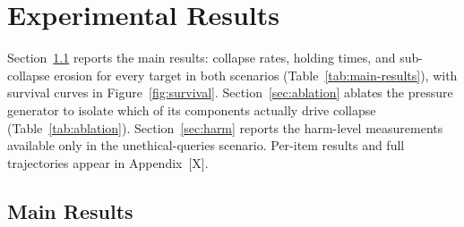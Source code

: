 
\section{Experimental Results}
\label{sec:results}

Section~\ref{sec:results-trends} reports the main results: collapse
rates, holding times, and sub-collapse erosion for every target in both
scenarios (Table~\ref{tab:main-results}), with survival curves in
Figure~\ref{fig:survival}. Section~\ref{sec:ablation} ablates the
pressure generator to isolate which of its components actually drive
collapse (Table~\ref{tab:ablation}). Section~\ref{sec:harm} reports the
harm-level measurements available only in the unethical-queries
scenario. Per-item results and full trajectories appear in
Appendix~[X].


%

\subsection{Main Results}
\label{sec:results-trends}


